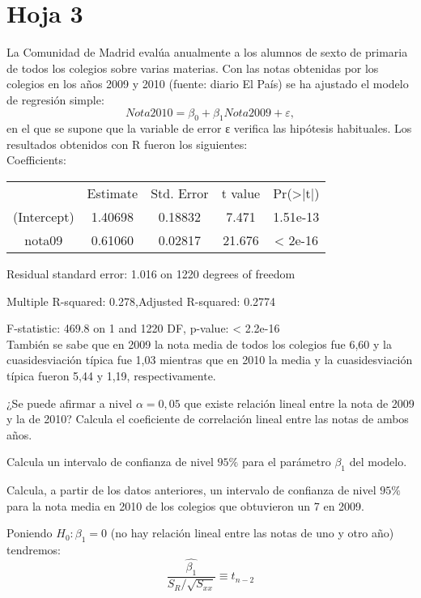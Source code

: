 


\section{Hoja 3}
\begin{problem}[1] La Comunidad de Madrid evalúa anualmente a los alumnos de sexto de primaria de todos los colegios sobre varias materias. Con las notas obtenidas por los colegios en los años 2009 y 2010 (fuente: diario El País) se ha ajustado el modelo de regresión simple:
\[Nota2010 = β_0 + β_1Nota2009 + ε,\]
en el que se supone que la variable de error ε verifica las hipótesis habituales. Los resultados
obtenidos con R fueron los siguientes:\\[1em]

Coefficients:

\begin{tabular}{c | c | c | c | c}
	~ & Estimate & Std. Error & t value & Pr(>|t|) \\
	(Intercept) & 1.40698 & 0.18832 & 7.471 & 1.51e-13 \\
	nota09 & 0.61060  & 0.02817 & 21.676 & < 2e-16
\end{tabular}

 Residual standard error: 1.016 on 1220 degrees of freedom

 Multiple R-squared: 0.278,Adjusted R-squared: 0.2774

 F-statistic: 469.8 on 1 and 1220 DF,  p-value: < 2.2e-16 \\[1em]

También se sabe que en 2009 la nota media de todos los colegios fue 6,60 y la cuasidesviación típica fue 1,03 mientras que en 2010 la media y la cuasidesviación típica fueron 5,44 y 1,19, respectivamente.

\ppart ¿Se puede afirmar a nivel $α = 0,05$ que existe relación lineal entre la nota de 2009 y la de 2010? Calcula el coeficiente de correlación lineal entre las notas de ambos años.

\ppart Calcula un intervalo de confianza de nivel $95\%$ para el parámetro $β_1$ del modelo.

\ppart Calcula, a partir de los datos anteriores, un intervalo de confianza de nivel $95\%$ para la nota
media en 2010 de los colegios que obtuvieron un 7 en 2009.


\solution
{}

\spart
Poniendo $H_0: β_1=0$ (no hay relación lineal entre las notas de uno y otro año) tendremos:
\[\frac{\hat{β_1}}{S_R / \sqrt{S_{xx}}} \equiv t_{n-2}\]


\end{problem}
